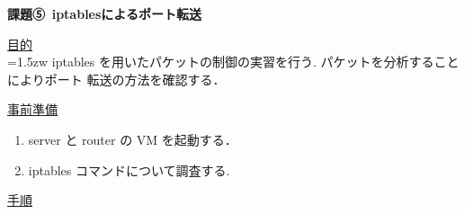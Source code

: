 



% 

\begin{center}

{\LARGE \bfseries 課題⑤\, iptablesによるポート転送\par}

\end{center}

\vspace{1cm}

{\LARGE \uline{目的}} \\

\hangindent=1.5zw
\noindent
iptables を用いたパケットの制御の実習を行う. パケットを分析することによりポート
転送の方法を確認する．

\vspace{1cm}

{\LARGE \uline{事前準備}} 

\begin{enumerate}
    \item server と router の VM を起動する．
    \item iptables コマンドについて調査する.
\end{enumerate}

\vspace{1cm}

{\LARGE \uline{手順}} 

